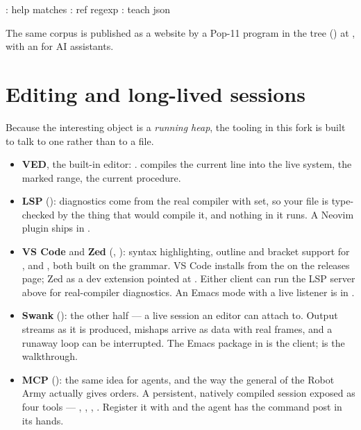 \begin{repl}
: help matches
: ref regexp
: teach json
\end{repl}

The same corpus is published as a website by a Pop-11 program in the tree
() at , with an
 for AI assistants.

\section{Editing and long-lived sessions}

Because the interesting object is a \emph{running heap}, the tooling in this
fork is built to talk to one rather than to a file.

\begin{itemize}
\item \textbf{VED}, the built-in editor: . 
  compiles the current line into the live system,  the marked
  range,  the current procedure.
\item \textbf{LSP} (): diagnostics come from the real
  compiler with  set, so your file is type-checked by
  the thing that would compile it, and nothing in it runs. A Neovim plugin
  ships in .
\item \textbf{VS Code} and \textbf{Zed} (,
  ): syntax highlighting, outline and bracket support for
  ,  and , both built on the
   grammar. VS Code installs from the
   on the releases page; Zed as a dev
  extension pointed at . Either client can run the LSP
  server above for real-compiler diagnostics. An Emacs mode with a live
  listener is in .
\item \textbf{Swank} (): the other half --- a live
  session an editor can attach to. Output streams as it is produced, mishaps
  arrive as data with real frames, and a runaway loop can be interrupted. The
  Emacs package in  is the client;
   is the walkthrough.
\item \textbf{MCP} (): the same idea for agents, and
  the way the general of the Robot Army actually gives orders. A persistent,
  natively compiled session exposed as four tools --- ,
  , , .
  Register it with  and the agent has the command post in its hands.
\end{itemize}

